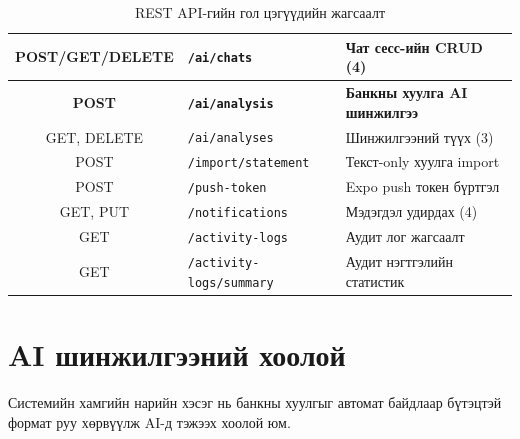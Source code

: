 \begin{table}[ht]
\begin{tabular}{|c|p{4.2cm}|p{6cm}|}
POST/GET/DELETE & \texttt{/ai/chats}        & Чат сесс-ийн CRUD (4) \\ \hline
\textbf{POST}   & \textbf{\texttt{/ai/analysis}} & \textbf{Банкны хуулга AI шинжилгээ} \\ \hline
GET, DELETE & \texttt{/ai/analyses}         & Шинжилгээний түүх (3) \\ \hline
POST   & \texttt{/import/statement}         & Текст-only хуулга import \\ \hline
POST   & \texttt{/push-token}               & Expo push токен бүртгэл \\ \hline
GET, PUT  & \texttt{/notifications}         & Мэдэгдэл удирдах (4) \\ \hline
GET    & \texttt{/activity-logs}            & Аудит лог жагсаалт \\ \hline
GET    & \texttt{/activity-logs/summary}    & Аудит нэгтгэлийн статистик \\ \hline
\end{tabular}
\caption{REST API-гийн гол цэгүүдийн жагсаалт}
\label{tab:endpoints}
\end{table}

\section{AI шинжилгээний хоолой}
Системийн хамгийн нарийн хэсэг нь банкны хуулгыг автомат байдлаар бүтэцтэй формат руу хөрвүүлж AI-д тэжээх хоолой юм.

